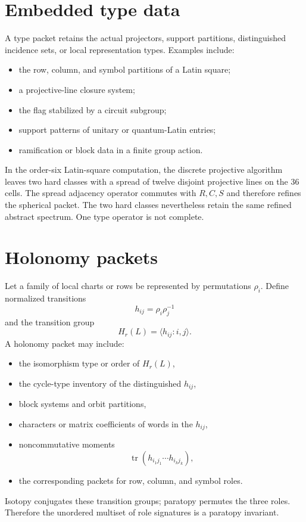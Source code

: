 \section{Embedded type data}
A type packet retains the actual projectors, support partitions, distinguished incidence sets, or local representation types.  Examples include:
\begin{itemize}
\item the row, column, and symbol partitions of a Latin square;
\item a projective-line closure system;
\item the flag stabilized by a circuit subgroup;
\item support patterns of unitary or quantum-Latin entries;
\item ramification or block data in a finite group action.
\end{itemize}

In the order-six Latin-square computation, the discrete projective algorithm leaves two hard classes with a spread of twelve disjoint projective lines on the $36$ cells.  The spread adjacency operator commutes with $R,C,S$ and therefore refines the spherical packet.  The two hard classes nevertheless retain the same refined abstract spectrum.  One type operator is not complete.

\section{Holonomy packets}
Let a family of local charts or rows be represented by permutations $\rho_i$.  Define normalized transitions
\[
h_{ij}=\rho_i\rho_j^{-1}
\]
and the transition group
\[
H_r(L)=\langle h_{ij}:i,j\rangle.
\]
A holonomy packet may include:
\begin{itemize}
\item the isomorphism type or order of $H_r(L)$,
\item the cycle-type inventory of the distinguished $h_{ij}$,
\item block systems and orbit partitions,
\item characters or matrix coefficients of words in the $h_{ij}$,
\item noncommutative moments
\[
\operatorname{tr}(h_{i_1j_1}\cdots h_{i_kj_k}),
\]
\item the corresponding packets for row, column, and symbol roles.
\end{itemize}

Isotopy conjugates these transition groups; paratopy permutes the three roles.  Therefore the unordered multiset of role signatures is a paratopy invariant.

